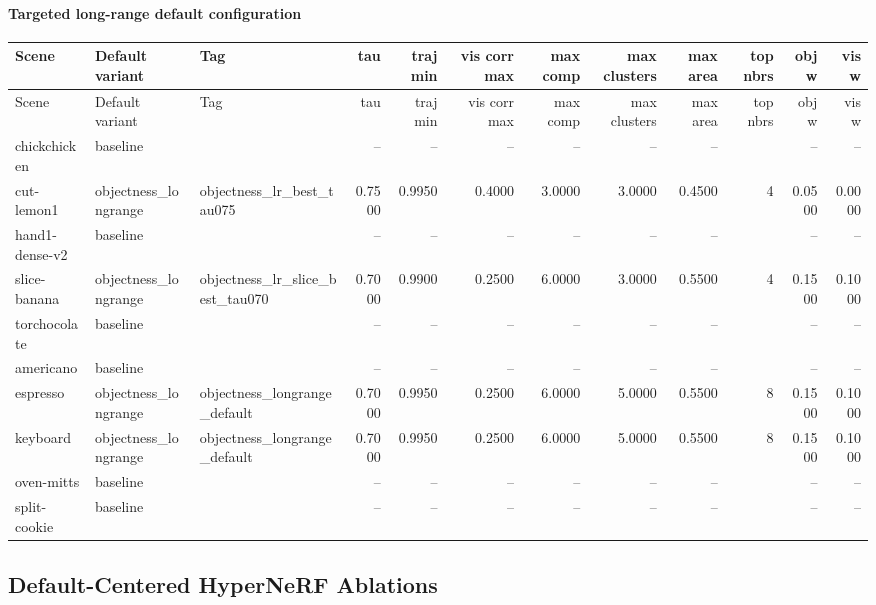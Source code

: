 \documentclass[10pt]{article}
\begin{document}
\paragraph{Targeted long-range default configuration}
\small
\begin{longtable}{lllrrrrrrrrr}
\toprule
Scene & Default variant & Tag & tau & traj min & vis corr max & max comp & max clusters & max area & top nbrs & obj w & vis w \\
\midrule
\endfirsthead
\toprule
Scene & Default variant & Tag & tau & traj min & vis corr max & max comp & max clusters & max area & top nbrs & obj w & vis w \\
\midrule
\endhead
chickchicken & baseline &  & -- & -- & -- & -- & -- & -- &  & -- & -- \\
cut-lemon1 & objectness\_longrange & objectness\_lr\_best\_tau075 & 0.7500 & 0.9950 & 0.4000 & 3.0000 & 3.0000 & 0.4500 & 4 & 0.0500 & 0.0000 \\
hand1-dense-v2 & baseline &  & -- & -- & -- & -- & -- & -- &  & -- & -- \\
slice-banana & objectness\_longrange & objectness\_lr\_slice\_best\_tau070 & 0.7000 & 0.9900 & 0.2500 & 6.0000 & 3.0000 & 0.5500 & 4 & 0.1500 & 0.1000 \\
torchocolate & baseline &  & -- & -- & -- & -- & -- & -- &  & -- & -- \\
americano & baseline &  & -- & -- & -- & -- & -- & -- &  & -- & -- \\
espresso & objectness\_longrange & objectness\_longrange\_default & 0.7000 & 0.9950 & 0.2500 & 6.0000 & 5.0000 & 0.5500 & 8 & 0.1500 & 0.1000 \\
keyboard & objectness\_longrange & objectness\_longrange\_default & 0.7000 & 0.9950 & 0.2500 & 6.0000 & 5.0000 & 0.5500 & 8 & 0.1500 & 0.1000 \\
oven-mitts & baseline &  & -- & -- & -- & -- & -- & -- &  & -- & -- \\
split-cookie & baseline &  & -- & -- & -- & -- & -- & -- &  & -- & -- \\
\bottomrule
\end{longtable}
\normalsize

\subsection{Default-Centered HyperNeRF Ablations}
\end{document}
